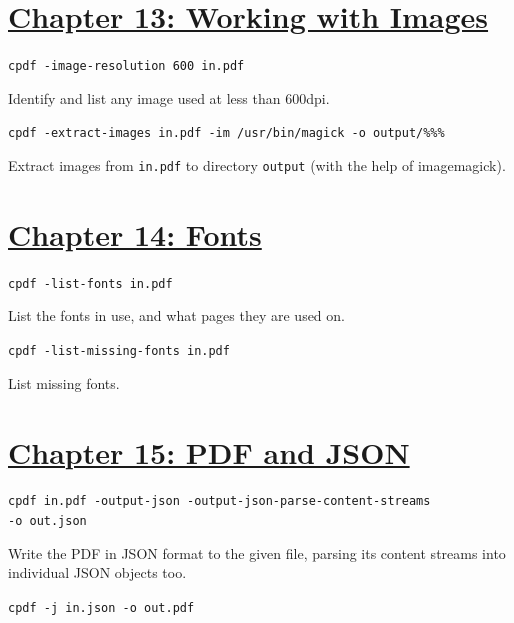 \documentclass{book}
\begin{document}
\section*{\hyperref[chap:13]{Chapter 13: Working with Images}}

\begin{framed}\noindent\texttt{cpdf -image-resolution 600 in.pdf}\end{framed}

\noindent Identify and list any image used at less than 600dpi.

\begin{framed}\noindent\texttt{cpdf -extract-images in.pdf -im /usr/bin/magick -o output/\%\%\%}\end{framed}

\noindent Extract images from \texttt{in.pdf} to directory \texttt{output} (with the help of imagemagick).


\section*{\hyperref[chap:14]{Chapter 14: Fonts}}

\begin{framed}\noindent\texttt{cpdf -list-fonts in.pdf}\end{framed}

\noindent List the fonts in use, and what pages they are used on.

\begin{framed}\noindent\texttt{cpdf -list-missing-fonts in.pdf}\end{framed}

\noindent List missing fonts.

\section*{\hyperref[chap:15]{Chapter 15: PDF and JSON}}

\begin{framed}\noindent\texttt{cpdf in.pdf -output-json -output-json-parse-content-streams\\\phantom{\ \ \ \ } -o out.json}\end{framed}

\noindent Write the PDF in JSON format to the given file, parsing its content streams into individual JSON objects too.

\begin{framed}\noindent\texttt{cpdf -j in.json -o out.pdf}\end{framed}
\end{document}
